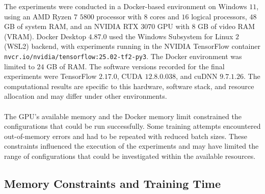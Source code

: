 \documentclass[12pt, a4paper]{report}
\let\oldsubsection\subsection
\renewcommand{\subsection}{%
    \Needspace{6\baselineskip}%
    \oldsubsection
}
\begin{document}
				The experiments were conducted in a Docker-based environment on Windows $11$, using an AMD Ryzen $7$ $5800$ processor with $8$ cores and $16$ logical processors, $48$ GB of system RAM, and an NVIDIA RTX $3070$ GPU with $8$ GB of video RAM (VRAM). Docker Desktop $4.87.0$ used the Windows Subsystem for Linux $2$ (WSL2) backend, with experiments running in the NVIDIA TensorFlow container \texttt{nvcr.io/nvidia/tensorflow:25.02-tf2-py3}. The Docker environment was limited to $24$ GB of RAM. The software versions recorded for the final experiments were TensorFlow $2.17.0$, CUDA $12.8.0.038$, and cuDNN $9.7.1.26$. The computational results are specific to this hardware, software stack, and resource allocation and may differ under other environments.\\\\
				The GPU's available memory and the Docker memory limit constrained the configurations that could be run successfully. Some training attempts encountered out-of-memory errors and had to be repeated with reduced batch sizes. These constraints influenced the execution of the experiments and may have limited the range of configurations that could be investigated within the available resources.
				
			\subsection{Memory Constraints and Training Time}
				
\end{document}
